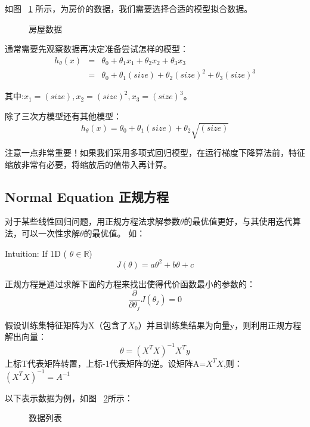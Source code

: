 \documentclass[UTF8]{ctexart}
\begin{document}
如图 ~\ref{fig:5} 所示，为房价的数据，我们需要选择合适的模型拟合数据。
\begin{figure}[htb]
 \caption{房屋数据}
 \label{fig:5}
 \end{figure}

通常需要先观察数据再决定准备尝试怎样的模型：
\begin{eqnarray*}
  h_\theta(x) & = & \theta_0+\theta_1x_1+\theta_2x_2+\theta_3x_3 \\
  & = & \theta_0+\theta_1(size)+\theta_2(size)^{2}+\theta_3(size)^{3}
\end{eqnarray*}

其中:$x_1=(size), x_2=(size)^{2},x_3=(size)^{3}$。

除了三次方模型还有其他模型：
\begin{equation*}
h_\theta(x)=\theta_0+\theta_1(size)+\theta_2\sqrt{(size)}
\end{equation*}

注意一点非常重要！如果我们采用多项式回归模型，在运行梯度下降算法前，特征缩放非常有必要，将缩放后的值带入再计算。

\subsection{Normal Equation 正规方程}
对于某些线性回归问题，用正规方程法求解参数$\theta$的最优值更好，与其使用迭代算法，可以一次性求解$\theta$的最优值。
如：

Intuition: If 1D ( $\theta \in \mathbb{R} $)
\begin{equation*}
J(\theta)=a\theta^{2}+b\theta+c
\end{equation*}

正规方程是通过求解下面的方程来找出使得代价函数最小的参数的：
\begin{equation*}
 \frac{\partial}{\partial\theta_j}
 J(\theta_j)=0
\end{equation*}

假设训练集特征矩阵为X（包含了$X_0$）并且训练集结果为向量y，则利用正规方程解出向量：
\begin{equation*}
  \theta=(X^{T}X)^{-1}X^{T}y
\end{equation*}
上标T代表矩阵转置，上标-1代表矩阵的逆。设矩阵A=$X^{T}X$,则：$(X^{T}X)^{-1}=A^{-1}$

以下表示数据为例，如图 ~\ref{fig:6}所示：

\begin{figure}[htb]
 \caption{数据列表}
 \label{fig:6}
 \end{figure}
\end{document}
